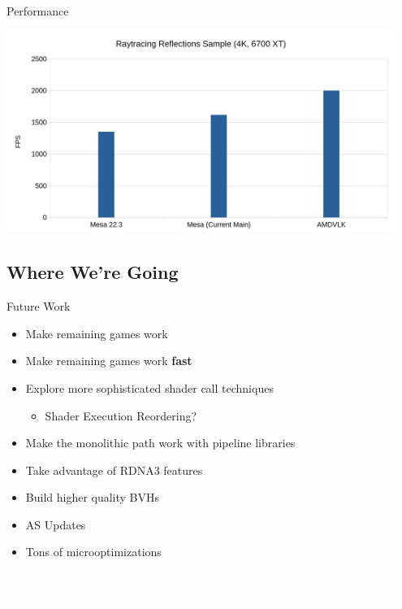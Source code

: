 \documentclass[aspectratio=169,t]{beamer}
\begin{document}
\begin{slide}{Performance}
\begin{center}
  \includegraphics[width=0.95\textwidth]{graphics/perfcomparison-rtreflections.png}
\end{center}
\end{slide}

\subsection{Where We're Going}
\begin{slide}{Future Work}
 \begin{itemize}
  \item Make remaining games work
  \item Make remaining games work \textbf{fast}
  \item Explore more sophisticated shader call techniques
  \begin{itemize}
   \item Shader Execution Reordering?
  \end{itemize}
  \item Make the monolithic path work with pipeline libraries
  \item Take advantage of RDNA3 features
  \item Build higher quality BVHs
  \item AS Updates
  \item Tons of microoptimizations
 \end{itemize}

\end{slide}

\chapterIntroConfig
\begin{slide}{ }
 \begin{center}
 \textcolor{white}{
 \huge
 \textbf{Thank You!}\\ \vspace{6pt}
 \normalsize
 Questions?}
 \end{center}
\end{slide}
\end{document}
